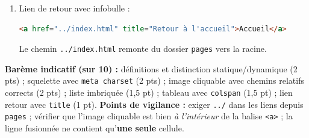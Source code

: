 \documentclass[11pt]{article}
\begin{document}
\begin{corrige}
\begin{enumerate}
\item Lien de retour avec infobulle :
\begin{lstlisting}[language=HTML]
<a href="../index.html" title="Retour à l'accueil">Accueil</a>
\end{lstlisting}
Le chemin \texttt{../index.html} remonte du dossier \texttt{pages} vers la racine.
\end{enumerate}
\textbf{Barème indicatif (sur 10) :} définitions et distinction statique/dynamique (2 pts) ; squelette avec \texttt{meta charset} (2 pts) ; image cliquable avec chemins relatifs corrects (2 pts) ; liste imbriquée (1,5 pt) ; tableau avec \texttt{colspan} (1,5 pt) ; lien retour avec \texttt{title} (1 pt).
\textbf{Points de vigilance :} exiger \texttt{../} dans les liens depuis \texttt{pages} ; vérifier que l'image cliquable est bien \emph{à l'intérieur} de la balise \texttt{<a>} ; la ligne fusionnée ne contient qu'\textbf{une seule} cellule.
\end{corrige}
\end{document}
